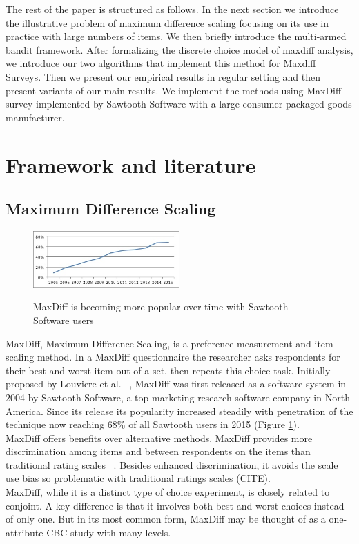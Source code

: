 \documentclass[nonblindrev]{informs3}
\begin{document}
The rest of the paper is structured as follows. In the next section we introduce the illustrative problem of maximum difference scaling focusing on its use in practice with large numbers of items. We then briefly introduce the multi-armed bandit framework. After formalizing the discrete choice model of maxdiff analysis, we introduce our two algorithms that implement this method for Maxdiff Surveys. Then we present our empirical results in regular setting and then present variants of our main results. We implement the methods using MaxDiff survey implemented by Sawtooth Software with a large consumer packaged goods manufacturer. \\


\section{Framework and literature}
\subsection{Maximum Difference Scaling}
\begin{figure}
\caption{MaxDiff is becoming more popular over time with Sawtooth Software users}
\includegraphics[width=0.5\textwidth]{plots/maxdiffpop}
\label{fig:pop}
\end{figure}
MaxDiff, Maximum Difference Scaling, is a preference measurement and item scaling method.  In a MaxDiff questionnaire the researcher asks respondents for their best and worst item out of a set, then repeats this choice task. Initially proposed by Louviere et al. ~\cite{louviere1991best}, MaxDiff was first released as a software system in 2004 by Sawtooth Software, a top marketing research software company in North America. Since its release its popularity increased steadily with penetration of the technique now reaching 68\% of all Sawtooth users in 2015 (Figure \ref{fig:pop}). \\

MaxDiff offers benefits over alternative methods. MaxDiff provides more discrimination among items and between respondents on the items than traditional rating scales ~\cite{cohen2004s}. Besides enhanced discrimination, it avoids the scale use bias so problematic with traditional ratings scales (CITE).\\
MaxDiff, while it is a distinct type of choice experiment, is closely related to conjoint. A key difference is that it involves both best and worst choices instead of only one. But in its most common form, MaxDiff may be thought of as a one-attribute CBC study with many levels.  \\
\end{document}

